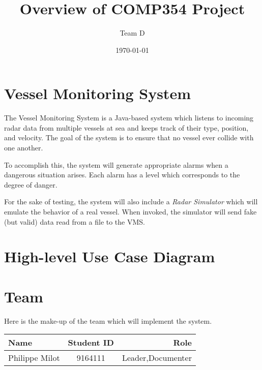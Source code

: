 \documentclass{article}
\begin{document}
\title{Overview of COMP354 Project}
\author{Team D}
\date{\today}

\maketitle

\section{Vessel Monitoring System}
The Vessel Monitoring System is a Java-based system which listens to incoming radar data from multiple vessels at sea and keeps track of their type, position, and velocity. The goal of the system is to ensure that no vessel ever collide with one another.

To accomplish this, the system will generate appropriate alarms when a dangerous situation arises. Each alarm has a level which corresponds to the degree of danger.

For the sake of testing, the system will also include a \emph{Radar Simulator} which will emulate the behavior of a real vessel. When invoked, the simulator will send fake (but valid) data read from a file to the VMS.

\section{High-level Use Case Diagram}

\section{Team}
Here is the make-up of the team which will implement the system.

\medskip
\begin{center}
\begin{tabular}{| l | c | r |}
\hline
Name & Student ID & Role \\ \hline
Philippe Milot & 9164111 & Leader,Documenter \\ \hline
\end{tabular}
\end{center}
\end{document}
